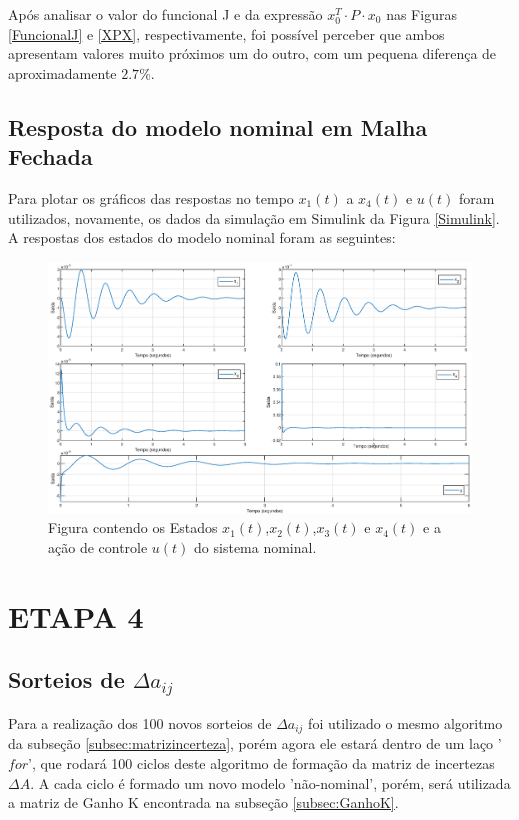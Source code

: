 \documentclass[a4paper,12pt]{article}
\begin{document}
Após analisar o valor do funcional J e da expressão $x_{0}^{T}\cdot P\cdot x_{0}$ nas Figuras \ref{FuncionalJ} e \ref{XPX}, respectivamente, foi possível perceber que ambos apresentam valores muito próximos um do outro, com um pequena diferença de aproximadamente $2.7\%$.

\clearpage

\subsection{Resposta do modelo nominal em Malha Fechada}

Para plotar os gráficos das respostas no tempo $x_1 (t)$ a $x_4 (t)$ e $u(t)$ foram utilizados, novamente, os dados da simulação em Simulink da Figura \ref{Simulink}. A respostas dos estados do modelo nominal foram as seguintes:

\begin{figure}[!h]
  \hspace*{-2.4cm} 
  \includegraphics[width=18 cm]{SaidasEstadoseAcao.eps}
  \centering
  \caption{Figura contendo os Estados $x_1(t)$,$x_2(t)$,$x_3(t)$ e $x_4(t)$ e a ação de controle $u(t)$ do sistema nominal.}
  \label{EstadosAcao}
\end{figure}

\newpage

\section{ETAPA 4}
\subsection{Sorteios de $\Delta{a_{ij}}$}

Para a realização dos 100 novos sorteios de $\Delta{a_{ij}}$ foi utilizado o mesmo algoritmo da subseção \ref{subsec:matrizincerteza}, porém agora ele estará dentro de um laço '$for$', que rodará 100 ciclos deste algoritmo de formação da matriz de incertezas $\Delta A$. A cada ciclo é formado um novo modelo 'não-nominal', porém, será utilizada a matriz de Ganho K encontrada na subseção \ref{subsec:GanhoK}.
\end{document}
